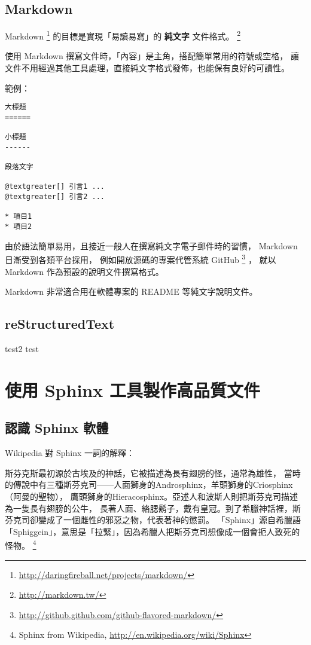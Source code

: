 \documentclass[a4paper,12pt,english]{sphinxmanual}
\begin{document}
\section{Markdown}
\label{syntax:markdown}
Markdown \footnote{
\href{http://daringfireball.net/projects/markdown/}{http://daringfireball.net/projects/markdown/}
} 的目標是實現「易讀易寫」的 \textbf{純文字} 文件格式。 \footnote{
\href{http://markdown.tw/}{http://markdown.tw/}
}

使用 Markdown 撰寫文件時，「內容」是主角，搭配簡單常用的符號或空格，
讓文件不用經過其他工具處理，直接純文字格式發佈，也能保有良好的可讀性。

範例：

\begin{Verbatim}[commandchars=@\[\]]
大標題
======

小標題
------

段落文字

@textgreater[] 引言1 ...
@textgreater[] 引言2 ...

* 項目1
* 項目2
\end{Verbatim}

由於語法簡單易用，且接近一般人在撰寫純文字電子郵件時的習慣，
Markdown 日漸受到各類平台採用，
例如開放源碼的專案代管系統 GitHub \footnote{
\href{http://github.github.com/github-flavored-markdown/}{http://github.github.com/github-flavored-markdown/}
} ，
就以 Markdown 作為預設的說明文件撰寫格式。

Markdown 非常適合用在軟體專案的 README 等純文字說明文件。


\section{reStructuredText}
\label{syntax:restructuredtext}
test2
test


\chapter{使用 Sphinx 工具製作高品質文件}
\label{sphinx:sphinx}\label{sphinx::doc}

\section{認識 Sphinx 軟體}
\label{sphinx_intro:sphinx}\label{sphinx_intro::doc}
Wikipedia 對 Sphinx 一詞的解釋：

\begin{DUlineblock}{0em}
\item[] 斯芬克斯最初源於古埃及的神話，它被描述為長有翅膀的怪，通常為雄性，
當時的傳說中有三種斯芬克司——人面獅身的Androsphinx，羊頭獅身的Criosphinx（阿曼的聖物），
鷹頭獅身的Hieracosphinx。亞述人和波斯人則把斯芬克司描述為一隻長有翅膀的公牛，
長著人面、絡腮鬍子，戴有皇冠。到了希臘神話裡，斯芬克司卻變成了一個雌性的邪惡之物，代表著神的懲罰。
「Sphinx」源自希臘語「Sphiggein」，意思是「拉緊」，因為希臘人把斯芬克司想像成一個會扼人致死的怪物。
\footnote{
Sphinx from Wikipedia, \href{http://en.wikipedia.org/wiki/Sphinx}{http://en.wikipedia.org/wiki/Sphinx}
}
\end{DUlineblock}
\end{document}
